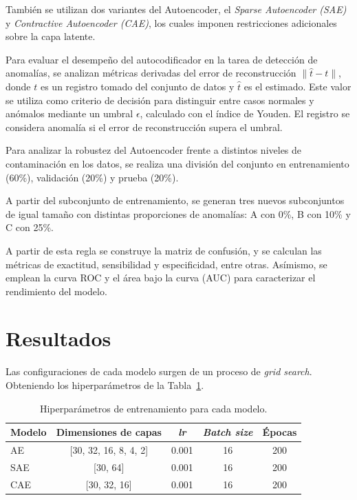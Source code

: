 \documentclass{llncs}
\begin{document}
También se utilizan dos variantes del Autoencoder, el \emph{Sparse Autoencoder (SAE)} y \emph{Contractive Autoencoder (CAE)}, los cuales imponen restricciones adicionales sobre la capa latente.


Para evaluar el desempeño del autocodificador en la tarea de detección de anomalías, se analizan métricas derivadas del error de reconstrucción $\lVert \hat{t} - t \rVert$, donde $t$ es un registro tomado del conjunto de datos y $ \hat{t}$ es el estimado. Este valor se utiliza como criterio de decisión para distinguir entre casos normales y anómalos mediante un umbral $\epsilon$, calculado con el índice de Youden. El registro se considera anomalía si el error de reconstrucción supera el umbral.

Para analizar la robustez del Autoencoder frente a distintos niveles de contaminación en los datos, se realiza una división del conjunto en entrenamiento (60\%), validación (20\%) y prueba (20\%).

A partir del subconjunto de entrenamiento, se generan tres nuevos subconjuntos de igual tamaño con distintas proporciones de anomalías: A con 0\%, B con 10\% y C con 25\%.

A partir de esta regla se construye la matriz de confusión, y se calculan las métricas de exactitud, sensibilidad y especificidad, entre otras. Asímismo, se emplean la curva ROC y el área bajo la curva (AUC) para caracterizar el rendimiento del modelo.

\section{Resultados}

Las configuraciones de cada modelo surgen de un proceso de \emph{grid search}. Obteniendo los hiperparámetros de la Tabla~\ref{tab:hiperparametros_modelos}.

\begin{table}
	\centering
	\caption{Hiperparámetros de entrenamiento para cada modelo.}
	\begin{tabular}{lcccc}
		\toprule
		\textbf{Modelo} &
		\textbf{Dimensiones de capas} &
		\textbf{\emph{lr}} &
		\textbf{\emph{Batch size}} &
		\textbf{Épocas} \\
		\midrule
		AE  & [30, 32, 16, 8, 4, 2] & 0.001 & 16 & 200 \\
		SAE & [30, 64] & 0.001 & 16 & 200 \\
		CAE & [30, 32, 16] & 0.001 & 16 & 200 \\
		\bottomrule
	\end{tabular}
	\label{tab:hiperparametros_modelos}
\end{table}
\end{document}
